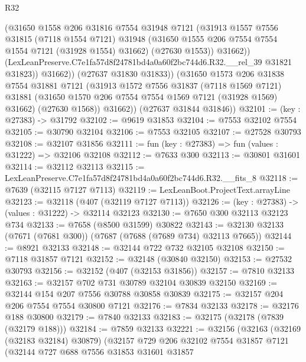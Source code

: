 \begin{lexlean}{R32}
\begin{coremodule}
                  (@31650
                    @1558
                    @206
                    @31816
                    @7554
                    @31948
                    @7121
                    (@31913
                      @1557
                      @7556
                      @31815
                      (@7118 @1554 @7121)
                      @31948
                      (@31650 @1555 @206 @7554 @7554 @1554 @7121 (@31928 @1554) @31662)
                      (@27630 @1553))
                    @31662))
                (LexLeanPreserve.C7e1fa57d8f24781bd4a0a60f2bc744d6.R32.__rel_39 @31821 @31823))
              @31662))
          (@27637 @31830 @31833))
        (@31650
          @1573
          @206
          @31838
          @7554
          @31881
          @7121
          (@31913
            @1572
            @7556
            @31837
            (@7118 @1569 @7121)
            @31881
            (@31650 @1570 @206 @7554 @7554 @1569 @7121 (@31928 @1569) @31662)
            (@27630 @1568))
          @31662))
      (@27637 @31844 @31846))
@32101 := (key : @27383) -> @31792
@32102 := @9619 @31853
@32104 := @7553 @32102 @7554
@32105 := @30790 @32104
@32106 := @7553 @32105
@32107 := @27528 @30793
@32108 := @32107 @31856
@32111 := fun (key : @27383) => fun (values : @31222) => @32106 @32108
@32112 := @7633 @300
@32113 := @30801 @31601
@32114 := @32112 @32113
@32115 := LexLeanPreserve.C7e1fa57d8f24781bd4a0a60f2bc744d6.R32.__fits_8
@32118 := @7639 (@32115 @7127 @7113)
@32119 := LexLeanBoot.ProjectText.arrayLine
@32123 := @32118 (@407 (@32119 @7127 @7113))
@32126 := (key : @27383) -> (values : @31222) -> @32114 @32123
@32130 := @7650 @300 @32113 @32123 @734
@32133 := @7658 (@8500 @31599) @30822
@32143 := @32130 @32133 (@7671 (@7681 @300)) (@7687 (@7688 (@7689 @734) @32113 @7665))
@32144 := @8921 @32133
@32148 := @32144 @722 @732 @32105 @32108
@32150 := @7118 @31857 @7121
@32152 := @32148 (@30840 @32150)
@32153 := @27532 @30793
@32156 := @32152 (@407 (@32153 @31856))
@32157 := @7810 @32133
@32163 := @32157 @702 @731 @30789 @32104 @30839 @32150
@32169 := @32144 @154 @207 @7556 @30788 @30858 @30839
@32175 := @32157 @204 @206 @7554 @7554 @30800 @7121
@32176 := @7834 @32133
@32178 := @32176 @188 @30800
@32179 := @7840 @32133
@32183 := @32175 (@32178 (@7839 (@32179 @188)))
@32184 := @7859 @32133
@32221 := @32156
    (@32163
      (@32169 (@32183 @32184) @30879)
      (@32157
        @729
        @206
        @32102
        @7554
        @31857
        @7121
        (@32144
          @727
          @688
          @7556
          @31853
          @31601
          @31857

\end{coremodule}
\end{lexlean}
